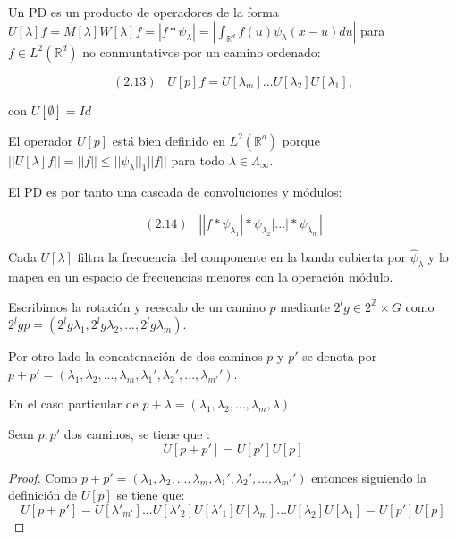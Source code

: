 \begin{definicion}
Un PD es un producto de operadores de la forma $U[\lambda]f=M[\lambda]W[\lambda]f=|f \ast \psi_\lambda|=\left | \int_{\mathbb{R}^d} f(u)\psi_\lambda(x-u) du \right|$ para $f \in L^2(\mathbb{R}^d)$ no conmuntativos por un camino ordenado:

$$(2.13) \;\;\; U[p]f=U[\lambda_m]...U[\lambda_2]U[\lambda_1],$$

con $U[\emptyset]=Id$
\end{definicion}

\noindent El operador $U[p]$ está bien definido en $L^2(\mathbb{R}^d)$ porque $\left|\left| U[\lambda]f \right|\right| = ||f|| \leq ||\psi_\lambda||_1 ||f||$ para todo $\lambda \in \Lambda_\infty$. 

El PD es por tanto una cascada de convoluciones y módulos: 

$$(2.14) \;\;\; \left| |f \ast \psi_{\lambda_1} | \ast \psi_{\lambda_2} | ... | \ast \psi_{\lambda_m} \right|$$

\medskip

\noindent Cada $U[\lambda]$ filtra la frecuencia del componente en la banda cubierta por $\widehat{\psi}_\lambda$ y lo mapea en un espacio de frecuencias menores con la operación módulo.

\begin{definicion}
Escribimos la rotación y reescalo de un camino $p$ mediante $2^lg \in 2^\mathbb{Z}\times G$ como $2^lgp=(2^lg\lambda_1,2^lg\lambda_2,...,2^lg\lambda_m)$.
\end{definicion}

\begin{definicion}
Por otro lado la concatenación de dos caminos $p$ y $p'$ se denota por $p+p'=(\lambda_1,\lambda_2,...,\lambda_m,\lambda_1',\lambda_2',...,\lambda_{m'}')$. 

En el caso particular de $p+\lambda=(\lambda_1,\lambda_2,...,\lambda_m,\lambda)$
\end{definicion}

\begin{proposicion} \label{proposicionSumaCaminos}
Sean $p, p'$ dos caminos, se tiene que :
$$U[p+p']=U[p']U[p]$$
\end{proposicion}

\begin{proof}
Como $p+p'=(\lambda_1,\lambda_2,...,\lambda_m,\lambda_1',\lambda_2',...,\lambda_{m'}')$ entonces siguiendo la definición de $U[p]$ se tiene que: 
$$U[p+p']=U[\lambda'_{m'}]...U[\lambda'_2]U[\lambda'_1]U[\lambda_{m}]...U[\lambda_2]U[\lambda_1]=U[p']U[p]$$ \qedhere
\end{proof}

